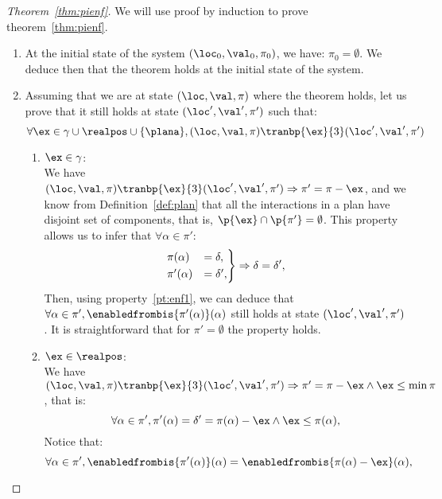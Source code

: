 \newpage
\appendix
\begin{proof}[Theorem~\ref{thm:pienf}]
  We will use proof by induction to prove theorem~\ref{thm:pienf}.
  \begin{enumerate}
    \item At the initial state of the system $(\loc_0,\val_0,\pi_0)$, we have:
      $\pi_0=\emptyset$. We deduce then that the theorem holds at the initial state of the system.
    \item Assuming that we are at state $(\loc,\val,\pi)$ where the theorem holds,
      let us prove that it still holds at state $(\loc',\val',\pi')$ such that:
      \begin{displaymath}
      \forall\ex\in\gamma\cup\realpos\cup\{\plana\},(\loc,\val,\pi)\tranbp{\ex}{3}(\loc',\val',\pi')
      \end{displaymath}
    \begin{enumerate}
      \item $\ex\in\gamma$:\\
        We have $(\loc,\val,\pi)\tranbp{\ex}{3}(\loc',\val',\pi')\Rightarrow\pi'=\pi-\ex$, and we know 
        from Definition~\ref{def:plan} that all the interactions in a plan have disjoint set of components, that is,
        $\p{\ex}\cap\p{\pi'}=\emptyset$. This property allows us to infer that $\forall\alpha\in\pi'$:
        $$\begin{rcases}
          \pi(\alpha)&=\delta,\\
          \pi'(\alpha)&=\delta',
        \end{rcases}\Rightarrow\delta=\delta',$$
        Then, using property~\ref{pt:enf1}, we can deduce that $\forall\alpha\in\pi',\enabledfrombis{\pi'(\alpha)}(\alpha)$ still holds at state $(\loc',\val',\pi')$.
        It is straightforward that for $\pi'=\emptyset$ the property holds. 
      \item $\ex\in\realpos$:\\
        We have $(\loc,\val,\pi)\tranbp{\ex}{3}(\loc',\val',\pi')\Rightarrow\pi'=\pi-\ex\wedge\ex\le\min\pi$, that is: 
        \begin{displaymath}
           \forall\alpha\in\pi',\pi'(\alpha)=\delta'=\pi(\alpha)-\ex\wedge \ex\le\pi(\alpha),
        \end{displaymath}
        Notice that:
        \begin{displaymath}
        \forall\alpha\in\pi',\enabledfrombis{\pi'(\alpha)}(\alpha)=\enabledfrombis{\pi(\alpha)-\ex}(\alpha),
        \end{displaymath}

\end{enumerate}
\end{enumerate}
\end{proof}
